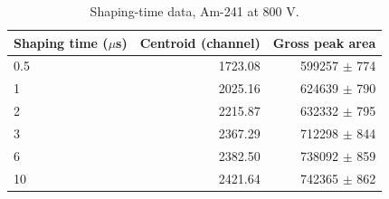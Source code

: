 \begin{table}[htbp]
\centering
\caption{Shaping-time data, Am-241 at 800 V.}
\label{tab:shaping-raw}
\begin{tabular}{lrr}
\toprule
Shaping time ($\mu$s) & Centroid (channel) & Gross peak area \\
\midrule
0.5 & 1723.08 & 599257 $\pm$ 774 \\
1 & 2025.16 & 624639 $\pm$ 790 \\
2 & 2215.87 & 632332 $\pm$ 795 \\
3 & 2367.29 & 712298 $\pm$ 844 \\
6 & 2382.50 & 738092 $\pm$ 859 \\
10 & 2421.64 & 742365 $\pm$ 862 \\
\bottomrule
\end{tabular}
\end{table}
